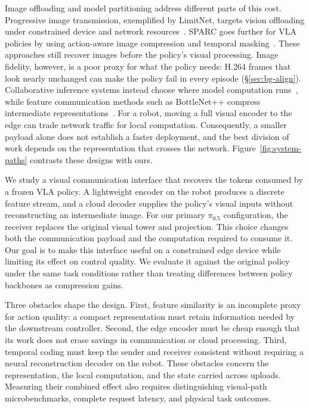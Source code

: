 Image offloading and model partitioning address different parts of this
cost. Progressive image transmission, exemplified by LimitNet, targets
vision offloading under constrained device and network
resources~\cite{limitnet}. SPARC goes further for VLA policies by using
action-aware image compression and temporal masking~\cite{sparc}.
These approaches still recover images before the policy's visual
processing. Image fidelity, however, is a poor proxy for what the policy needs:
H.264 frames that look nearly unchanged can make the policy fail in every
episode (\S\ref{sec:bg-align}). Collaborative inference systems instead choose where model
computation runs~\cite{neurosurgeon,roboecc,rapid}, while feature
communication methods such as BottleNet++ compress intermediate
representations~\cite{bottlenetpp}. For a robot, moving a full visual
encoder to the edge can trade network traffic for local computation.
Consequently, a smaller payload alone does not establish a faster
deployment, and the best division of work depends on the representation
that crosses the network.
Figure~\ref{fig:system-paths} contrasts these designs with ours.

We study a visual communication interface that recovers the tokens
consumed by a frozen VLA policy. A lightweight encoder on the robot
produces a discrete feature stream, and a cloud decoder supplies the
policy's visual inputs without reconstructing an intermediate image.
For our primary $\pi_{0.5}$ configuration, the receiver replaces the
original visual tower and projection. This choice changes both the
communication payload and the computation required to consume it. Our
goal is to make this interface useful on a constrained edge device while
limiting its effect on control quality. We evaluate it against the
original policy under the same task conditions rather than treating
differences between policy backbones as compression gains.

Three obstacles shape the design. First, feature similarity is an
incomplete proxy for action quality: a compact representation must retain
information needed by the downstream controller. Second, the edge encoder
must be cheap enough that its work does not erase savings in communication
or cloud processing. Third, temporal coding must keep the sender and
receiver consistent without requiring a neural reconstruction decoder on
the robot. These obstacles concern the representation, the local
computation, and the state carried across uploads. Measuring their
combined effect also requires distinguishing visual-path microbenchmarks,
complete request latency, and physical task outcomes.

